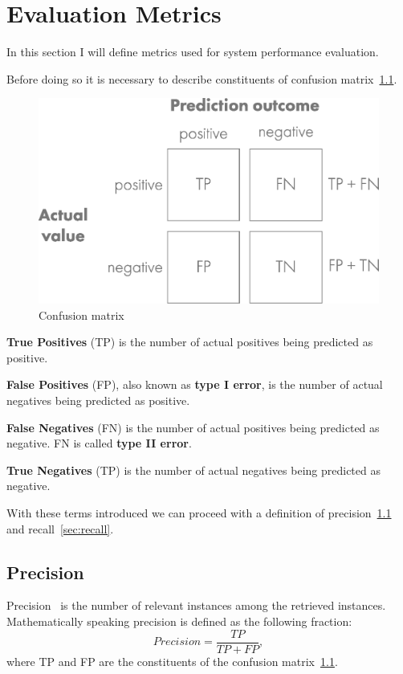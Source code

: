 \chapter{Evaluation Metrics}\label{ch:evaluation-metrics}
In this section I will define metrics used for system performance evaluation.

Before doing so it is necessary to describe constituents of confusion matrix~\ref{fig:confusionmat}.

\begin{figure}[H]
    \centering
    \includegraphics[width=0.9\columnwidth]{images/implementation/confusionmatrix.eps}
    \caption{Confusion matrix~\cite{ConfMat}}
    \label{fig:confusionmat}
\end{figure}

\textbf{True Positives} (TP) is the number of actual positives being predicted as positive.

\textbf{False Positives} (FP), also known as \textbf{type I error}, is the number of actual negatives being predicted
as positive.

\textbf{False Negatives} (FN) is the number of actual positives being predicted as negative.
FN is called \textbf{type II error}.

\textbf{True Negatives} (TP) is the number of actual negatives being predicted as negative.

With these terms introduced we can proceed with a definition of precision~\ref{sec:precision} and
recall~\ref{sec:recall}.

\section{Precision}\label{sec:precision}
Precision~\cite{PreRec} is the number of relevant instances among the retrieved instances.
Mathematically speaking precision is defined as the following fraction:
\begin{equation}
    Precision = \frac{TP}{TP + FP},
\end{equation}
where TP and FP are the constituents of the confusion matrix~\ref{fig:confusionmat}.

